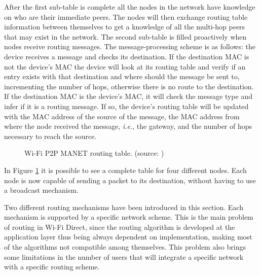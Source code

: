After the first sub-table is complete all the nodes in the network have knowledge on who are their immediate peers. The nodes will then exchange routing table information between themselves to get a knowledge of all the multi-hop peers that may exist in the network. The second sub-table is filled proactively when nodes receive routing messages. The message-processing scheme is as follows: the device receives a message and checks its destination. If the destination \gls{MAC} is not the device's \gls{MAC} the device will look at its routing table and verify if an entry exists with that destination and where should the message be sent to, incrementing the number of hops, otherwise there is no route to the destination. If the destination \gls{MAC} is the device's \gls{MAC}, it will check the message type and infer if it is a routing message. If so, the device's routing table will be updated with the \gls{MAC} address of the source of the message, the \gls{MAC} address from where the node received the message, \textit{i.e.}, the gateway, and the number of hops necessary to reach the source.

\begin{figure}[ht]
	\noindent{}
	\caption{\label{fig:routeTables} Wi-Fi P2P MANET routing table. (source: \cite{manet})}
\end{figure}

In Figure \ref{fig:routeTables} it is possible to see a complete table for four different nodes. Each node is now capable of sending a packet to its destination, without having to use a broadcast mechanism.

Two different routing mechanisms have been introduced in this section. Each mechanism is supported by a specific network scheme. This is the main problem of routing in Wi-Fi Direct, since the routing algorithm is developed at the application layer thus being always dependent on implementation, making most of the algorithms not compatible among themselves. This problem also brings some limitations in the number of users that will integrate a specific network with a specific routing scheme.












